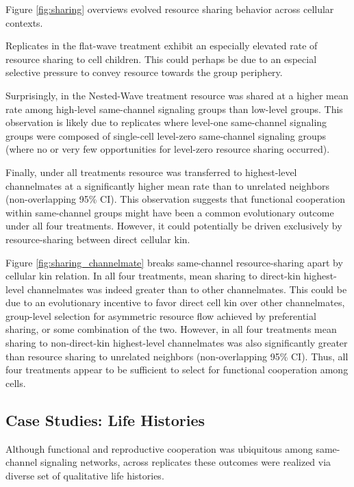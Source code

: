 


Figure \ref{fig:sharing} overviews evolved resource sharing behavior across cellular contexts.

Replicates in the flat-wave treatment exhibit an especially elevated rate of resource sharing to cell children.
This could perhaps be due to an especial selective pressure to convey resource towards the group periphery.

Surprisingly, in the Nested-Wave treatment resource was shared at a higher mean rate among high-level same-channel signaling groups than low-level groups.
This observation is likely due to replicates where level-one same-channel signaling groups were composed of single-cell level-zero same-channel signaling groups (where no or very few opportunities for level-zero resource sharing occurred).

Finally, under all treatments resource was transferred to highest-level channelmates at a significantly higher mean rate than to unrelated neighbors (non-overlapping 95\% CI).
This observation suggests that functional cooperation within same-channel groups might have been a common evolutionary outcome under all four treatments.
However, it could potentially be driven exclusively by resource-sharing between direct cellular kin.

Figure \ref{fig:sharing_channelmate} breaks same-channel resource-sharing apart by cellular kin relation.
In all four treatments, mean sharing to direct-kin highest-level channelmates was indeed greater than to other channelmates.
This could be due to an evolutionary incentive to favor direct cell kin over other channelmates, group-level selection for asymmetric resource flow achieved by preferential sharing, or some combination of the two.
However, in all four treatments mean sharing to non-direct-kin highest-level channelmates was also significantly greater than resource sharing to unrelated neighbors (non-overlapping 95\% CI).
Thus, all four treatments appear to be sufficient to select for functional cooperation among cells.

\subsection{Case Studies: Life Histories} \label{sec:life-histories}

Although functional and reproductive cooperation was ubiquitous among same-channel signaling networks, across replicates these outcomes were realized via diverse set of qualitative life histories.


